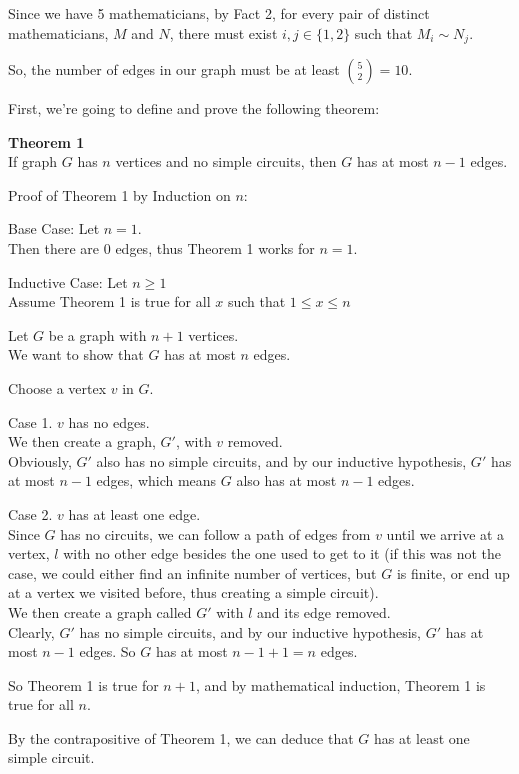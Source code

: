 \documentclass[fleqn]{article}
\begin{document}
Since we have 5 mathematicians, by Fact 2, for every pair of distinct mathematicians, $M$ and $N$, there must exist $i,j \in \lbrace 1,2 \rbrace$ such that $M_i \sim N_j$.

So, the number of edges in our graph must be at least ${5 \choose 2} = 10$.

First, we're going to define and prove the following theorem:

\textbf{Theorem 1}\\
If graph $G$ has $n$ vertices and no simple circuits,
then $G$ has at most $n-1$ edges.

Proof of Theorem 1 by Induction on $n$:

Base Case: Let $n = 1$.\\
Then there are 0 edges, thus Theorem 1 works for $n=1$.

Inductive Case: Let $n \geq 1$\\
Assume Theorem 1 is true for all $x$ such that $1 \leq x \leq n$

Let $G$ be a graph with $n+1$ vertices.\\
We want to show that $G$ has at most $n$ edges.

Choose a vertex $v$ in $G$.

Case 1. $v$ has no edges.\\
We then create a graph, $G'$, with $v$ removed.\\
Obviously, $G'$ also has no simple circuits, and by our inductive hypothesis, $G'$ has at most $n-1$ edges, which means $G$ also has at most $n-1$ edges.

Case 2. $v$ has at least one edge.\\
Since $G$ has no circuits, we can follow a path of edges from $v$ until we arrive at a vertex, $l$ with no other edge besides the one used to get to it (if this was not the case, we could either find an infinite number of vertices, but $G$ is finite, or end up at a vertex we visited before, thus creating a simple circuit).\\
We then create a graph called $G'$ with $l$ and its edge removed.
\\Clearly, $G'$ has no simple circuits, and by our inductive hypothesis, $G'$ has at most $n-1$ edges. So $G$ has at most $n-1+1=n$ edges.


So Theorem 1 is true for $n+1$, and by mathematical induction, Theorem 1 is true for all $n$.
 
By the contrapositive of Theorem 1, we can deduce that $G$ has at least one simple circuit.
\end{document}
